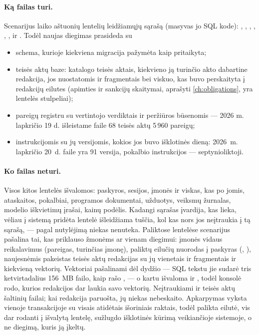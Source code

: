 \paragraph{Ką failas turi.} Scenarijus laiko aštuonių lentelių leidžiamųjų sąrašą (masyvas
 jo SQL kode): , ,
, , , ,
 ir . Todėl naujas diegimas prasideda su
\begin{itemize}
  \item schema, kurioje kiekviena migracija pažymėta kaip pritaikyta;
  \item teisės aktų baze: katalogo teisės aktais, kiekvieno ją turinčio akto dabartine redakcija,
    jos nuostatomis ir fragmentais bei viskuo, kas buvo perskaityta į redakcijų eilutes
    (apimties ir sankcijų skaitymai, aprašyti \cref{ch:obligations}, yra lentelės
     stulpeliai);
  \item pareigų registru su vertintojo verdiktais ir peržiūros būsenomis --- 2026 m. lapkričio
    19 d. išleistame faile 68 teisės aktų 5\,960 pareigų;
  \item instrukcijomis su jų versijomis, kokios jos buvo išklotinės dieną: 2026~m. lapkričio
    20~d. faile yra 91 versija, pokalbio instrukcijos --- septynioliktoji.
\end{itemize}

\paragraph{Ko failas neturi.} Visos kitos lentelės išvalomos: paskyros, sesijos, įmonės ir viskas,
kas po jomis, ataskaitos, pokalbiai, programos dokumentai, užduotys, veiksmų žurnalas, modelio
iškvietimų įrašai, kainų podėlis. Kadangi sąrašas įvardija, kas lieka, vėliau į sistemą pridėta
lentelė išleidžiama tuščia, kol kas nors jos neįtraukia į tą sąrašą, --- pagal nutylėjimą niekas
nenuteka. Paliktose lentelėse scenarijus pašalina tai, kas priklauso žmonėms ar vienam diegimui:
įmonės vidaus reikalavimus (pareigas, turinčias įmonę), paliktų eilučių nuorodas į paskyras
(, ), naujesnėmis pakeistas teisės aktų redakcijas su jų vienetais ir
fragmentais ir kiekvieną vektorių. Vektoriai pašalinami dėl dydžio --- SQL tekstu jie sudarė tris
ketvirtadalius 156~MB failo, kaip rašo , --- o kartu išvaloma ir
, todėl konsolė rodo, kurios redakcijos dar laukia savo vektorių. Neįtraukiami
ir teisės aktų šaltinių failai; kai redakcija paruošta, jų niekas nebeskaito. Apkarpymas vyksta
vienoje transakcijoje su visais atidėtais išoriniais raktais, todėl palikta eilutė, vis dar
rodanti į išvalytą lentelę, sužlugdo išklotinės kūrimą veikiančioje sistemoje, o ne diegimą,
kuris ją įkeltų.

